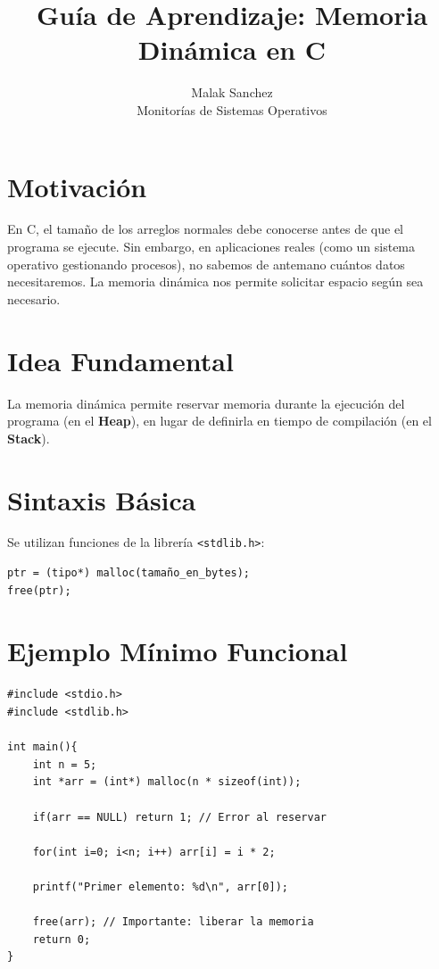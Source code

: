 \documentclass[12pt,a4paper]{article}
\title{\textbf{Guía de Aprendizaje: Memoria Dinámica en C}}
\author{Malak Sanchez \\ \small Monitorías de Sistemas Operativos}
\date{}
\begin{document}
\maketitle

\section{Motivación}
En C, el tamaño de los arreglos normales debe conocerse antes de que el programa se ejecute. Sin embargo, en aplicaciones reales (como un sistema operativo gestionando procesos), no sabemos de antemano cuántos datos necesitaremos. La memoria dinámica nos permite solicitar espacio según sea necesario.

\section{Idea Fundamental}
La memoria dinámica permite reservar memoria durante la ejecución del programa (en el \textbf{Heap}), en lugar de definirla en tiempo de compilación (en el \textbf{Stack}).

\section{Sintaxis Básica}
Se utilizan funciones de la librería \texttt{<stdlib.h>}:
\begin{lstlisting}[numbers=none]
ptr = (tipo*) malloc(tamaño_en_bytes);
free(ptr);
\end{lstlisting}

\section{Ejemplo Mínimo Funcional}
\begin{lstlisting}
#include <stdio.h>
#include <stdlib.h>

int main(){
    int n = 5;
    int *arr = (int*) malloc(n * sizeof(int));

    if(arr == NULL) return 1; // Error al reservar

    for(int i=0; i<n; i++) arr[i] = i * 2;
    
    printf("Primer elemento: %d\n", arr[0]);

    free(arr); // Importante: liberar la memoria
    return 0;
}
\end{lstlisting}
\end{document}
